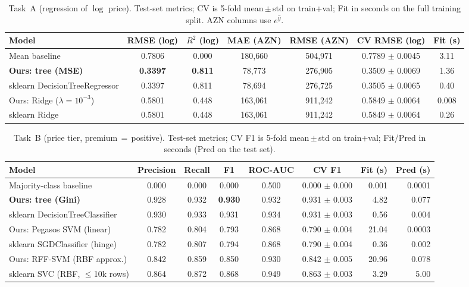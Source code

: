 \documentclass[10pt,twocolumn,a4paper]{article}
\begin{document}
\begin{table}[t]
  \centering
  \small
  \caption{Task~A (regression of $\log$ price). Test-set metrics; CV is 5-fold mean\,$\pm$\,std on train+val; Fit in seconds on the full training split. AZN columns use $e^{\hat y}$.}
  \label{tab:resultsA}
  \begin{tabular}{@{}lcccccc@{}}
    \toprule
    Model & RMSE (log) & $R^2$ (log) & MAE (AZN) & RMSE (AZN) & CV RMSE (log) & Fit (s) \\
    \midrule
    Mean baseline              & 0.7806 & 0.000 & 180{,}660 & 504{,}971 & 0.7789 $\pm$ 0.0045 & 3.11 \\
    \textbf{Ours: tree (MSE)}  & \textbf{0.3397} & \textbf{0.811} & 78{,}773 & 276{,}905 & 0.3509 $\pm$ 0.0069 & 1.36 \\
    sklearn DecisionTreeRegressor & 0.3397 & 0.811 & 78{,}694 & 276{,}725 & 0.3505 $\pm$ 0.0065 & 0.40 \\
    Ours: Ridge ($\lambda{=}10^{-3}$) & 0.5801 & 0.448 & 163{,}061 & 911{,}242 & 0.5849 $\pm$ 0.0064 & 0.008 \\
    sklearn Ridge              & 0.5801 & 0.448 & 163{,}061 & 911{,}242 & 0.5849 $\pm$ 0.0064 & 0.26 \\
    \bottomrule
  \end{tabular}
\end{table}

\begin{table}[t]
  \centering
  \small
  \caption{Task~B (price tier, premium\,$=$\,positive). Test-set metrics; CV F1 is 5-fold mean\,$\pm$\,std on train+val; Fit/Pred in seconds (Pred on the test set).}
  \label{tab:resultsB}
  \begin{tabular}{@{}lcccccrr@{}}
    \toprule
    Model & Precision & Recall & F1 & ROC-AUC & CV F1 & Fit (s) & Pred (s) \\
    \midrule
    Majority-class baseline      & 0.000 & 0.000 & 0.000 & 0.500 & 0.000 $\pm$ 0.000 & 0.001 & 0.0001 \\
    \textbf{Ours: tree (Gini)}   & 0.928 & 0.932 & \textbf{0.930} & 0.932 & 0.931 $\pm$ 0.003 & 4.82 & 0.077 \\
    sklearn DecisionTreeClassifier & 0.930 & 0.933 & 0.931 & 0.934 & 0.931 $\pm$ 0.003 & 0.56 & 0.004 \\
    Ours: Pegasos SVM (linear)   & 0.782 & 0.804 & 0.793 & 0.868 & 0.790 $\pm$ 0.004 & 21.04 & 0.0003 \\
    sklearn SGDClassifier (hinge) & 0.782 & 0.807 & 0.794 & 0.868 & 0.790 $\pm$ 0.004 & 0.36 & 0.002 \\
    Ours: RFF-SVM (RBF approx.)  & 0.842 & 0.859 & 0.850 & 0.930 & 0.842 $\pm$ 0.005 & 20.96 & 0.078 \\
    sklearn SVC (RBF, $\le$10k rows) & 0.864 & 0.872 & 0.868 & 0.949 & 0.863 $\pm$ 0.003 & 3.29 & 5.00 \\
    \bottomrule
  \end{tabular}
\end{table}
\end{document}

